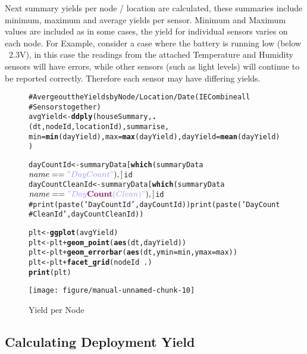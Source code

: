 \documentclass[10pt,a4paper]{article}\usepackage{graphicx, color}
\makeatletter
\def\maxwidth{ %
  \ifdim\Gin@nat@width>\linewidth
    \linewidth
  \else
    \Gin@nat@width
  \fi
}
\newcommand{\hlfunctioncall}[1]{\textcolor[rgb]{0.501960784313725,0,0.329411764705882}{\textbf{#1}}}%
\newcommand{\hlstring}[1]{\textcolor[rgb]{0.6,0.6,1}{#1}}%
\newcommand{\hlcomment}[1]{\textcolor[rgb]{0.180392156862745,0.6,0.341176470588235}{#1}}%
\newenvironment{kframe}{%
 \def\at@end@of@kframe{}%
 \ifinner\ifhmode%
  \def\at@end@of@kframe{\end{minipage}}%
  \begin{minipage}{\columnwidth}%
 \fi\fi%
 \def\FrameCommand##1{\hskip\@totalleftmargin \hskip-\fboxsep
 \colorbox{shadecolor}{##1}\hskip-\fboxsep
     \hskip-\linewidth \hskip-\@totalleftmargin \hskip\columnwidth}%
 \MakeFramed {\advance\hsize-\width
   \@totalleftmargin\z@ \linewidth\hsize
   \@setminipage}}%
 {\par\unskip\endMakeFramed%
 \at@end@of@kframe}
\newenvironment{knitrout}{}{} %
\makeatother
\begin{document}
Next summary yields per node / location are calculated, these summaries include
minimum, maximum and average yields per sensor.  Minimum and Maximum values are
included as in some cases, the yield for individual sensors varies on each node.
For Example, consider a case where the battery is running low (below ~2.3V), in
this case the readings from the attached Temperature and Humidity sensors will
have errors, while other sensors (such as light levels) will continue to be
reported correctly.  Therefore each sensor may have differing yields.

\begin{figure}
  \label{fig:node-yield}

\begin{knitrout}
\color{fgcolor}\begin{kframe}
\begin{alltt}
\hlcomment{# Averge out the Yields by Node / Location / Date (IE Combine all}
\hlcomment{# Sensors together)}
avgYield <- \hlfunctioncall{ddply}(houseSummary, \hlfunctioncall{.}(dt, nodeId, locationId), summarise, 
    min = \hlfunctioncall{min}(dayYield), max = \hlfunctioncall{max}(dayYield), dayYield = \hlfunctioncall{mean}(dayYield))

dayCountId <- summaryData[\hlfunctioncall{which}(summaryData$name == \hlstring{"Day Count"}), ]$id
dayCountCleanId <- summaryData[\hlfunctioncall{which}(summaryData$name == \hlstring{"Day \hlfunctioncall{Count} (Clean)"}), 
    ]$id
\hlcomment{# print(paste('Day Count Id ',dayCountId)) print(paste('Day Count}
\hlcomment{# Clean Id ',dayCountCleanId))}

plt <- \hlfunctioncall{ggplot}(avgYield)
plt <- plt + \hlfunctioncall{geom_point}(\hlfunctioncall{aes}(dt, dayYield))
plt <- plt + \hlfunctioncall{geom_errorbar}(\hlfunctioncall{aes}(dt, ymin = min, ymax = max))
plt <- plt + \hlfunctioncall{facet_grid}(nodeId ~ .)
\hlfunctioncall{print}(plt)
\end{alltt}
\end{kframe}

{\centering \texttt{[image: figure/manual-unnamed-chunk-10]} 

}



\end{knitrout}

\caption{Yield per Node}
\end{figure}

\subsection{Calculating Deployment Yield}
\end{document}
